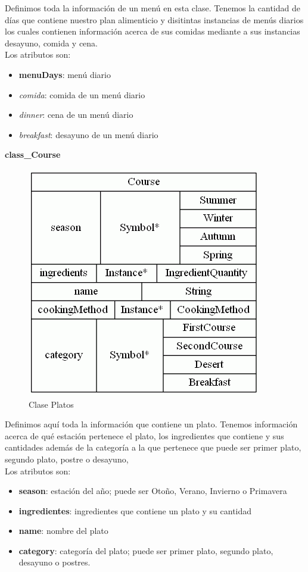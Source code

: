 \documentclass[12]{article}
\begin{document}
Definimos toda la información de un menú en esta clase. Tenemos la cantidad de días que contiene nuestro plan alimenticio y disitintas instancias de menús diarios los cuales contienen información acerca de sus comidas mediante a sus instancias desayuno, comida y cena. 
\\

Los atributos son: 
\begin{itemize}
\item \textbf{menuDays}: menú diario
\item \textit{comida}: comida de un menú diario
\item \textit{dinner}: cena de un menú diario
\item \textit{breakfast}: desayuno de un menú diario
\end{itemize}

\vspace{0.5cm}

\textbf{class\_Course}
\begin{figure}[H]
\centering
\includegraphics[scale=0.5]{images/classCourse.png}
\caption{Clase Platos}
\label{platos}
\end{figure}

Definimos aquí toda la información que contiene un plato. Tenemos información acerca de qué estación pertenece el plato, los ingredientes que contiene y sus cantidades además de la categoría a la que pertenece que puede ser primer plato, segundo plato, postre o desayuno, 
\\

Los atributos son:
\begin{itemize}
\item \textbf{season}: estación del año; puede ser Otoño, Verano, Invierno o Primavera
\item \textbf{ingredientes}: ingredientes que contiene un plato y su cantidad
\item \textbf{name}: nombre del plato
\item \textbf{category}: categoría del plato; puede ser primer plato, segundo plato, desayuno o postres. 
\end{itemize}
\end{document}
